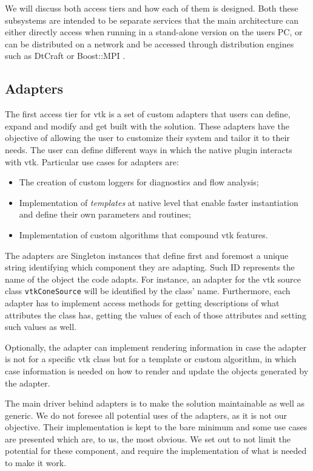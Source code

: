 We will discuss both access tiers and how each of them is designed. Both these subsystems are intended to be separate services that the main architecture can either directly access when running in a stand-alone version on the users PC, or can be distributed on a network and be accessed through distribution engines such as DtCraft \cite{huang2017dtcraft} or Boost::MPI \cite{schaling2011boost}.

\subsection{Adapters}
\label{sec:design-adapters}

The first access tier for \acrshort{vtk} is a set of custom adapters that users can define, expand and modify and get built with the solution. These adapters have the objective of allowing the user to customize their system and tailor it to their needs. The user can define different ways in which the native plugin interacts with \acrshort{vtk}. Particular use cases for adapters are:

\begin{itemize}
    \item The creation of custom loggers for diagnostics and flow analysis;
    \item Implementation of \textit{templates} at native level that enable faster instantiation and define their own parameters and routines;
    \item Implementation of custom algorithms that compound \acrshort{vtk} features.
\end{itemize}

The adapters are Singleton instances that define first and foremost a unique string identifying which component they are adapting. Such ID represents the name of the object the code adapts. For instance, an adapter for the \acrshort{vtk} source class \verb|vtkConeSource| will be identified by the class' name. Furthermore, each adapter has to implement access methods for getting descriptions of what attributes the class has, getting the values of each of those attributes and setting such values as well. 

Optionally, the adapter can implement rendering information in case the adapter is not for a specific \acrshort{vtk} class but for a template or custom algorithm, in which case information is needed on how to render and update the objects generated by the adapter.

The main driver behind adapters is to make the solution maintainable as well as generic. We do not foresee all potential uses of the adapters, as it is not our objective. Their implementation is kept to the bare minimum and some use cases are presented which are, to us, the most obvious. We set out to not limit the potential for these component, and require the implementation of what is needed to make it work.

